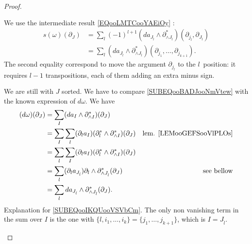 \begin{proof}
\begin{subproof}
		We use the intermediate result \eqref{EQooLMTCooYAEiOy} :
		\begin{subequations}
			\begin{align}
				s(\omega)(\partial_J) & =\sum_{l}(-1)^{l+1}(da_{J_{\hat l}}\wedge \partial^*_{\wedge J_{\hat l}})(\partial_{j_l},\partial_{J_{\hat l}})                      \\
				                      & =\sum_l(da_{J_{\hat l}}\wedge \partial^*_{\wedge J_{\hat l}})(\partial_{j_1},\ldots, \partial_{j_{k+1}}).		\label{SUBEQooBADJooNmVtew}
			\end{align}
		\end{subequations}
		The second equality correspond to move the argument \( \partial_{j_l} \) to the \( l\)\ieme\ position: it requires \( l-1\) transpositions, each of them adding an extra minus sign.

		We are still with \( J\) sorted. We have to compare \eqref{SUBEQooBADJooNmVtew} with the known expression of \( d\omega\). We have
		\begin{subequations}
			\begin{align}
				(d\omega)(\partial_J) & =\sum_I(da_I\wedge\partial^*_{\wedge I})(\partial_J)                                                                                                                \\
				                      & =\sum_I\sum_l(\partial_la_I)(\partial^*_l\wedge\partial^*_{\wedge I})(\partial_J)                   & \text{lem. \ref{LEMooGEFSooVlPLOs}}                           \\
				                      & =\sum_l\sum_I(\partial_la_I)(\partial^*_l\wedge\partial^*_{\wedge I})(\partial_J)                                                                                   \\
				                      & = \sum_l(\partial_la_{J_{\hat l}})\partial_l\wedge\partial^*_{\wedge J_{\hat l}}(\partial_J)        & \text{see bellow}                 \label{SUBEQooIKQUooVSVbCm} \\
				                      & = \sum_lda_{J_{\hat l}}\wedge\partial^*_{\wedge J_{\hat l}}(\partial_J).		\label{SUBEQooTVDQooSAfZYQ}
			\end{align}
		\end{subequations}
		Explanation for \eqref{SUBEQooIKQUooVSVbCm}. The only non vanishing term in the sum over \( I\) is the one with \( \{ l,i_1,\ldots,i_k \}=\{ j_1,\ldots,j_{k+1} \}\), which is \( I=J_{\hat l}\).


\end{subproof}
\end{proof}
